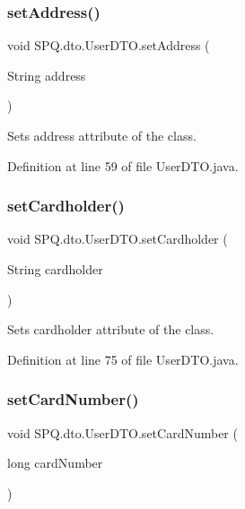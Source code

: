 \subsubsection{\texorpdfstring{set\+Address()}{setAddress()}}
{\footnotesize\ttfamily void S\+P\+Q.\+dto.\+User\+D\+T\+O.\+set\+Address (\begin{DoxyParamCaption}\item[{String}]{address }\end{DoxyParamCaption})}

Sets address attribute of the class. 

Definition at line 59 of file User\+D\+T\+O.\+java.

\mbox{\label{class_s_p_q_1_1dto_1_1_user_d_t_o_a3627efce4d0873f1e706e8ad65a28506}} 
\subsubsection{\texorpdfstring{set\+Cardholder()}{setCardholder()}}
{\footnotesize\ttfamily void S\+P\+Q.\+dto.\+User\+D\+T\+O.\+set\+Cardholder (\begin{DoxyParamCaption}\item[{String}]{cardholder }\end{DoxyParamCaption})}

Sets cardholder attribute of the class. 

Definition at line 75 of file User\+D\+T\+O.\+java.

\mbox{\label{class_s_p_q_1_1dto_1_1_user_d_t_o_a9f35044d63cd9769575a5ec019dc9cca}} 
\subsubsection{\texorpdfstring{set\+Card\+Number()}{setCardNumber()}}
{\footnotesize\ttfamily void S\+P\+Q.\+dto.\+User\+D\+T\+O.\+set\+Card\+Number (\begin{DoxyParamCaption}\item[{long}]{card\+Number }\end{DoxyParamCaption})}

